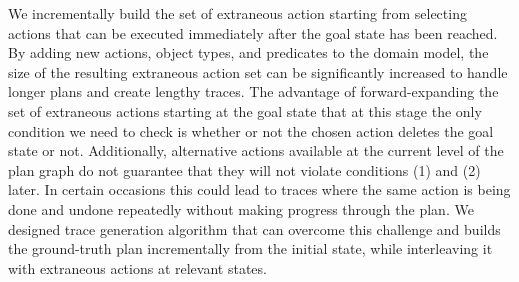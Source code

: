 We incrementally build the set of extraneous action starting from selecting actions that can be executed immediately after the goal state has been reached. By adding new actions, object types, and predicates to the domain model, the size of the resulting extraneous action set can be significantly increased to handle longer plans and create lengthy traces. The advantage of forward-expanding the set of extraneous actions starting at the goal state that at this stage the only condition we need to check is whether or not the chosen action deletes the goal state or not. Additionally, alternative actions available at the current level of the plan graph do not guarantee that they will not violate conditions (1) and (2) later. In certain occasions this could lead to traces where the same action is being done and undone repeatedly without making progress through the plan. We designed  trace generation algorithm that can overcome this challenge and builds the ground-truth plan incrementally from the initial state, while interleaving it with extraneous actions at relevant states.

